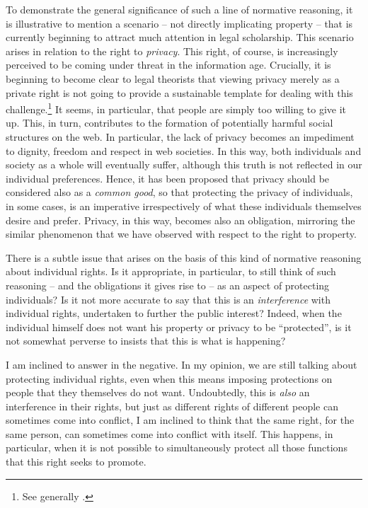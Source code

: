 \documentclass[12pt,a4paper]{book} %
\begin{document}
To demonstrate the general significance of such a line of normative reasoning, it is illustrative to mention a scenario -- not directly implicating property -- that is currently beginning to attract much attention in legal scholarship. This scenario arises in relation to the right to {\it privacy}. This right, of course, is increasingly perceived to be coming under threat in the information age. Crucially, it is beginning to become clear to legal theorists that viewing privacy merely as a private right is not going to provide a sustainable template for dealing with this challenge.\footnote{See generally \cite{schafer14}.} It seems, in particular, that people are simply too willing to give it up. This, in turn, contributes to the formation of potentially harmful social structures on the web. In particular, the lack of privacy becomes an impediment to dignity, freedom and respect in web societies. In this way, both individuals and society as a whole will eventually suffer, although this truth is not reflected in our individual preferences. Hence, it has been proposed that privacy should be considered also as a {\it common good}, so that protecting the privacy of individuals, in some cases, is an imperative irrespectively of what these individuals themselves desire and prefer. Privacy, in this way, becomes also an obligation, mirroring the similar phenomenon that we have observed with respect to the right to property.

There is a subtle issue that arises on the basis of this kind of normative reasoning about individual rights. Is it appropriate, in particular, to still think of such reasoning -- and the obligations it gives rise to -- as an aspect of protecting individuals? Is it not more accurate to say that this is an {\it interference} with individual rights, undertaken to further the public interest? Indeed, when the individual himself does not want his property or privacy to be ``protected'', is it not somewhat perverse to insists that this is what is happening? 

I am inclined to answer in the negative. In my opinion, we are still talking about protecting individual rights, even when this means imposing protections on people that they themselves do not want. Undoubtedly, this is {\it also} an interference in their rights, but just as different rights of different people can sometimes come into conflict, I am inclined to think that the same right, for the same person, can sometimes come into conflict with itself. This happens, in particular, when it is not possible to simultaneously protect all those functions that this right seeks to promote. 
\end{document}
